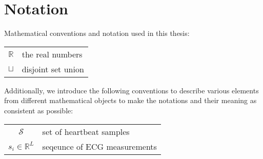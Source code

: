 
\section*{Notation}
Mathematical conventions and notation used in this thesis:

\begin{center}
    \renewcommand{\arraystretch}{1.5}
    \begin{tabular}{ c l }
        
        $\mathbb{R}$ & the real numbers \\
        $\sqcup$ & disjoint set union
    \end{tabular}
\end{center}

Additionally, we introduce the following conventions to describe various elements from different mathematical objects to make the notations and their meaning as consistent as possible:

\begin{center}
    \renewcommand{\arraystretch}{1.5}
    \begin{tabular}{c l}
        $\mathcal{S}$ & set of heartbeat samples \\
        $s_i \in \mathbb{R}^L$ & seqeunce of ECG measurements


    \end{tabular}
\end{center}
